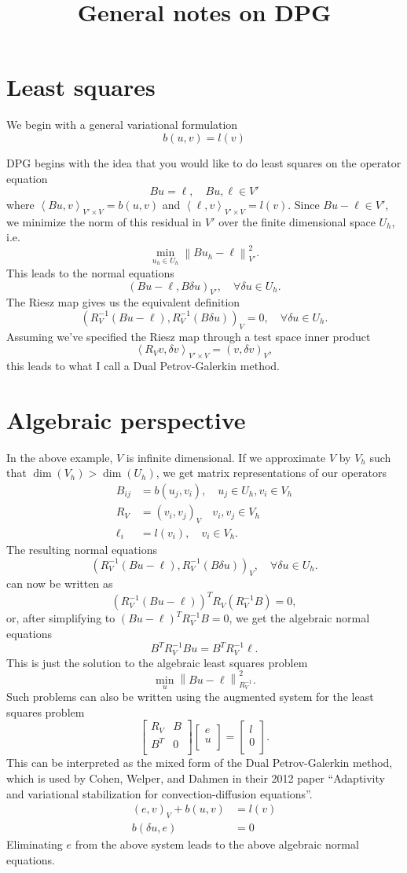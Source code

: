 \documentclass{article}
\title{General notes on DPG}
\newcommand{\nor}[1]{\left\| #1 \right\|}
\newcommand{\LRp}[1]{\left( #1 \right)}
\newcommand{\LRa}[1]{\left\langle #1 \right\rangle}
\def\arr#1#2#3#4{\left[
\begin{array}{cc}
#1 & #2\\
#3 & #4\\
\end{array}
\right]}
\def\vecttwo#1#2{\left[
\begin{array}{c}
#1\\
#2\\
\end{array}
\right]}
\begin{document}
\maketitle

\section{Least squares}

We begin with a general variational formulation 
\[
b(u,v) = l(v)
\]

DPG begins with the idea that you would like to do least squares on the operator equation 
\[
Bu = \ell, \quad Bu, \ell \in V'
\]
where $\LRa{Bu,v}_{V'\times V} = b(u,v)$ and $\LRa{\ell, v}_{V'\times V} = l(v)$.  Since $Bu - \ell \in V'$, we minimize the norm of this residual in $V'$ over the finite dimensional space $U_h$, i.e. 
\[
\min_{u_h \in U_h} \nor{Bu_h - \ell}_{V'}^2.
\]
This leads to the normal equations 
\[
\LRp{Bu-\ell, B\delta u}_{V'}, \quad \forall \delta u \in U_h.
\]
The Riesz map gives us the equivalent definition 
\[
\LRp{R_V^{-1}\LRp{Bu-\ell}, R_V^{-1}\LRp{B\delta u}}_{V} = 0, \quad \forall \delta u \in U_h.
\]
Assuming we've specified the Riesz map through a test space inner product
\[
\LRa{R_V v , \delta v}_{V'\times V}= (v,\delta v)_V,
\]
this leads to what I call a Dual Petrov-Galerkin method.  

\section{Algebraic perspective} 

In the above example, $V$ is infinite dimensional.  If we approximate $V$ by $V_h$ such that $\dim (V_h) > \dim (U_h)$, we get matrix representations of our operators
\begin{align*}
B_{ij} &= b(u_j, v_i), \quad u_j \in U_h, v_i \in V_h\\
R_V &= (v_i,v_j)_V \quad  v_i,v_j\in V_h\\
\ell_i &= l(v_i), \quad v_i \in V_h.
\end{align*}
The resulting normal equations 
\[
\LRp{R_V^{-1}\LRp{Bu-\ell}, R_V^{-1}\LRp{B\delta u}}_{V}, \quad \forall \delta u \in U_h.
\]
can now be written as 
\[
\LRp{R_V^{-1}\LRp{Bu-\ell}}^T R_V \LRp{R_V^{-1}B} = 0, 
\]
or, after simplifying to $\LRp{Bu-\ell}^T R_V^{-1} B = 0$, we get the algebraic normal equations
\[
B^TR_V^{-1}Bu = B^TR_V^{-1} \ell.
\]
This is just the solution to the algebraic least squares problem
\[
\min_u \nor{Bu-\ell}_{R_V^{-1}}^2.
\]
Such problems can also be written using the augmented system for the least squares problem
\[
\arr{R_V}{B}{B^T}{0}\vecttwo{e}{u} = \vecttwo{l}{0}.
\]
This can be interpreted as the mixed form of the Dual Petrov-Galerkin method, which is used by Cohen, Welper, and Dahmen in their 2012 paper ``Adaptivity and variational stabilization for convection-diffusion equations''.  
\begin{align*}
(e,v)_V + b(u,v) &= l(v) \\
b(\delta u,e) &= 0
\end{align*}
Eliminating $e$ from the above system leads to the above algebraic normal equations.  
\end{document}
